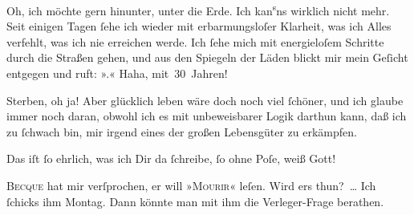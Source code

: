 \pstart
            Oh, ich möchte gern  hinunter, unter die Erde. Ich kan\substVorne{}\textsuperscript{s}\substDazwischen{}ns\substHinten{} wirklich nicht mehr. Seit einigen Tagen{ }ſehe ich wieder mit erbarmungsloſer
               Klarheit, was ich Alles verfehlt, was {\pb}ich nie
               erreichen werde. Ich{ }ſehe mich mit energieloſem Schritte durch die Straßen gehen, und
               aus den Spiegeln der Läden blickt mir mein Geſicht entgegen und ruft: »\label{K_L02739-3v}\label{K_L02739-3}.« Haha, mit 30 Jahren!\pend
           
\pstart
           Sterben, oh ja! Aber glücklich leben wäre doch noch viel{ }ſchöner, und {\pb}ich glaube immer noch daran, obwohl ich es mit
               unbeweisbarer Logik darthun kann, daß ich zu{ }ſchwach bin, mir irgend eines der großen
               Lebensgüter zu erkämpfen.\pend
           
\pstart
           Das iſt{ }ſo ehrlich, was ich Dir da{ }ſchreibe,{ }ſo ohne Poſe, weiß Gott!\pend
           
\pstart
           \textsc{Becque} hat mir verſprochen, er will »\textsc{Mourir}« leſen. Wird ers thun? {\dots} Ich {\pb}ſchicks ihm Montag.
               Dann könnte man mit ihm die Verleger-Frage berathen.\pend
           
